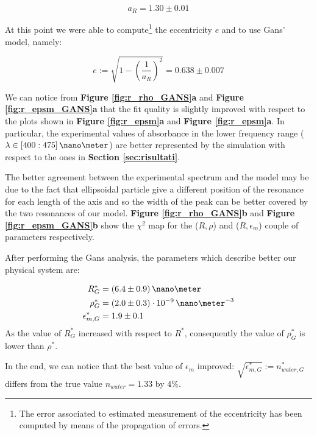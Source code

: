\documentclass[twocolumn]{article}
\begin{document}
\begin{multicols}{2}
\[a_R=1.30\pm 0.01\]

At this point we were able to compute\footnote{The error associated to estimated measurement of the eccentricity has been computed by means of the propagation of errors.} the eccentricity $e$ and to use Gans' model, namely:

\[e:=\sqrt{1-\left(\frac{1}{a_R}\right)^2} = 0.638 \pm 0.007\]

We can notice from \textbf{Figure \ref{fig:r_rho_GANS}a} and \textbf{Figure \ref{fig:r_epsm_GANS}a } that the fit quality is slightly improved with respect to the plots shown in \textbf{Figure \ref{fig:r_epsm}a} and \textbf{Figure \ref{fig:r_epsm}a}. In particular, the experimental values of absorbance in the lower frequency range ($\lambda \in [400:475]\, \nano\meter$) are better represented by the simulation with respect to the ones in \textbf{Section \ref{sec:risultati}}.

The better agreement between the experimental spectrum and the model may be due  to the fact that ellipsoidal particle give a different position of the resonance for each length of the axis and so the width of the peak can be better covered by the two resonances of our model. \textbf{Figure \ref{fig:r_rho_GANS}b} and \textbf{Figure \ref{fig:r_epsm_GANS}b} show the $\chi^2$ map  for the ($R,\rho$) and ($R,\epsilon_m$) couple of parameters respectively.

After performing the Gans analysis, the parameters which describe better our physical system are:

\begin{align*}
    R^*_{G}&=(6.4\pm 0.9)\,\nano\meter \\
    \rho^*_{G}&=(2.0\pm 0.3)\cdot 10^{-9}\,\nano\meter^{-3} \\
    \epsilon_{m,G}^* &= 1.9 \pm 0.1
\end{align*}
As the value of $R^*_G$ increased with respect to $R^*$, consequently the value of $\rho_G^*$ is lower than $\rho^*$.

In the end, we can notice that the best value of $\epsilon_m$ improved: $\sqrt{\epsilon_{m,G} ^*} := n_{water,G}^*$ differs from the true value $n_{water}=1.33$ by $4\%$.

\end{multicols}
\newpage
\end{document}
